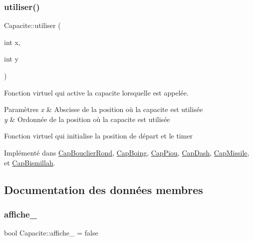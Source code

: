 \mbox{\label{class_capacite_a6f5e6efda11f80ab8538e23f5bdc6e79}} 
\subsubsection{\texorpdfstring{utiliser()}{utiliser()}}
{\footnotesize\ttfamily Capacite\+::utiliser (\begin{DoxyParamCaption}\item[{int}]{x,  }\item[{int}]{y }\end{DoxyParamCaption})\hspace{0.3cm}{\ttfamily [pure virtual]}}



Fonction virtuel qui active la capacite lorsqu\textquotesingle{}elle est appelée. 


\begin{DoxyParams}{Paramètres}
{\em x} & Abscisse de la position où la capacite est utilisée \\
\hline
{\em y} & Ordonnée de la position où la capacite est utilisée\\
\hline
\end{DoxyParams}
Fonction virtuel qui initialise la position de départ et le timer 

Implémenté dans \hyperlink{class_cap_bouclier_rond_a058b65433ae77666bc6b64d787b455fb}{Cap\+Bouclier\+Rond}, \hyperlink{class_cap_boing_af68b4064c3a6dafd10adbd63c2f27547}{Cap\+Boing}, \hyperlink{class_cap_piou_aad0eb3b9fab67785e1d0441b96aa921f}{Cap\+Piou}, \hyperlink{class_cap_dash_a8a0fe26c8b13d8a9f6cf5a95d6559f3d}{Cap\+Dash}, \hyperlink{class_cap_missile_a4ba082615a3721083142549a4c8216ad}{Cap\+Missile}, et \hyperlink{class_cap_bismillah_a9c3b48cacee26d055f24bf05f669cfca}{Cap\+Bismillah}.



\subsection{Documentation des données membres}
\mbox{\label{class_capacite_a8b566779d1926b5db0ed5ec4d8cd7891}} 
\subsubsection{\texorpdfstring{affiche\+\_\+}{affiche\_}}
{\footnotesize\ttfamily bool Capacite\+::affiche\+\_\+ = false\hspace{0.3cm}{\ttfamily [protected]}}

